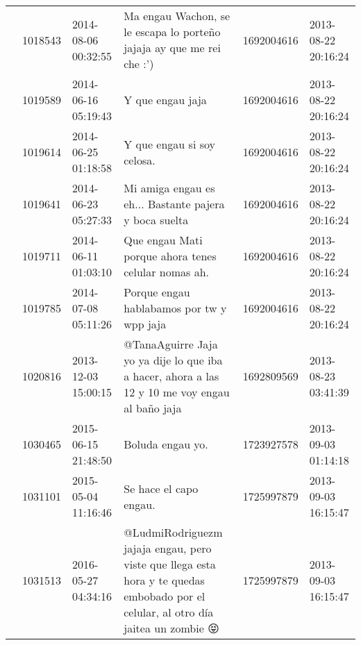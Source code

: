 \begin{tabular}{llllrl}
           & 1018543 & 2014-08-06 00:32:55 &                                                                        Ma engau Wachon, se le escapa lo porteño jajaja ay que me rei che :') &  1692004616 & 2013-08-22 20:16:24 \\
           & 1019589 & 2014-06-16 05:19:43 &                                                                                                                             Y que engau jaja &  1692004616 & 2013-08-22 20:16:24 \\
           & 1019614 & 2014-06-25 01:18:58 &                                                                                                                   Y que engau si soy celosa. &  1692004616 & 2013-08-22 20:16:24 \\
           & 1019641 & 2014-06-23 05:27:33 &                                                                                        Mi amiga engau es eh... Bastante pajera y boca suelta &  1692004616 & 2013-08-22 20:16:24 \\
           & 1019711 & 2014-06-11 01:03:10 &                                                                                          Que engau Mati porque ahora tenes celular nomas ah. &  1692004616 & 2013-08-22 20:16:24 \\
           & 1019785 & 2014-07-08 05:11:26 &                                                                                                    Porque engau hablabamos por tw y wpp jaja &  1692004616 & 2013-08-22 20:16:24 \\
           & 1020816 & 2013-12-03 15:00:15 &                                              @TanaAguirre  Jaja yo ya dije lo que iba a hacer, ahora a las 12 y 10 me voy engau al baño jaja &  1692809569 & 2013-08-23 03:41:39 \\
           & 1030465 & 2015-06-15 21:48:50 &                                                                                                                             Boluda engau yo. &  1723927578 & 2013-09-03 01:14:18 \\
           & 1031101 & 2015-05-04 11:16:46 &                                                                                                                       Se hace el capo engau. &  1725997879 & 2013-09-03 16:15:47 \\
           & 1031513 & 2016-05-27 04:34:16 &            @LudmiRodriguezm jajaja engau, pero viste que llega esta hora y te quedas embobado por el celular, al otro día jaitea un zombie 😝 &  1725997879 & 2013-09-03 16:15:47 \\

\end{tabular}
